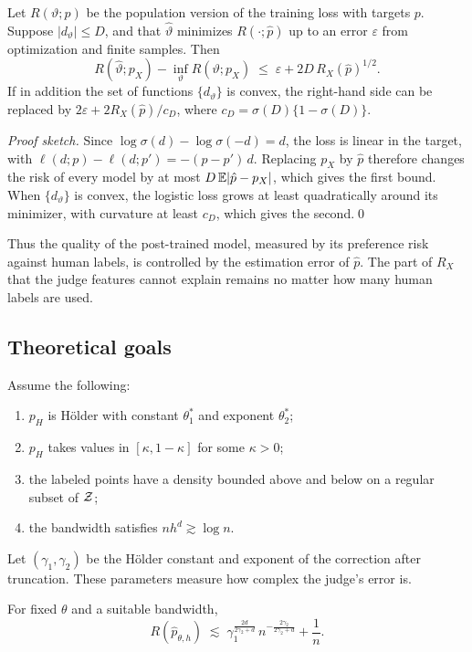 \begin{proposition}
\label{prop:bridge}
Let $R(\vartheta;p)$ be the population version of the training loss with targets $p$. Suppose
$|d_\vartheta|\le D$, and that $\hat\vartheta$ minimizes $R(\cdot;\hat p)$ up to an error
$\varepsilon$ from optimization and finite samples. Then
\[
  R(\hat\vartheta;p_X)-\inf_\vartheta R(\vartheta;p_X)\;\le\;\varepsilon+2D\,R_X(\hat p)^{1/2}.
\]
If in addition the set of functions $\{d_\vartheta\}$ is convex, the right-hand side can be
replaced by $2\varepsilon+2R_X(\hat p)/c_D$, where $c_D=\sigma(D)\{1-\sigma(D)\}$.
\end{proposition}

\noindent\emph{Proof sketch.} Since $\log\sigma(d)-\log\sigma(-d)=d$, the loss is linear in the
target, with $\ell(d;p)-\ell(d;p')=-(p-p')\,d$. Replacing $p_X$ by $\hat p$ therefore changes the risk
of every model by at most $D\,\mathbb{E}|\hat p-p_X|$, which gives the first bound. When $\{d_\vartheta\}$ is
convex, the logistic loss grows at least quadratically around its minimizer, with curvature at
least $c_D$, which gives the second.\qed

\medskip
Thus the quality of the post-trained model, measured by its preference risk against human labels,
is controlled by the estimation error of $\hat p$. The part of $R_X$ that the judge features cannot
explain remains no matter how many human labels are used.

\subsection{Theoretical goals}

Assume the following:
\begin{enumerate}[label=(\roman*)]
  \item $p_H$ is H\"older with constant $\theta_1^{*}$ and exponent $\theta_2^{*}$;
  \item $p_H$ takes values in $[\kappa,1-\kappa]$ for some $\kappa>0$;
  \item the labeled points have a density bounded above and below on a regular subset of $\mathcal{Z}$;
  \item the bandwidth satisfies $nh^d\gtrsim\log n$.
\end{enumerate}
Let $(\gamma_1,\gamma_2)$ be the H\"older constant and exponent of the correction after truncation.
These parameters measure how complex the judge's error is.

\begin{goal}
For fixed $\theta$ and a suitable bandwidth,
\[
  R(\hat p_{\theta,h})\;\lesssim\;\gamma_1^{\frac{2d}{2\gamma_2+d}}\,
  n^{-\frac{2\gamma_2}{2\gamma_2+d}}+\frac1n .
\]
\end{goal}

